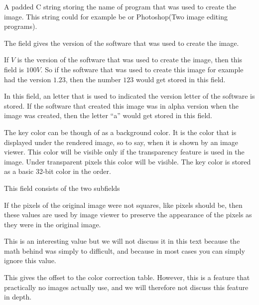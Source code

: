 A \nullm padded C string storing the name of program that was used to
create the image. This string could for example be \gimp or
Photoshop(Two image editing programs).


The field gives the version of the software that was used to create
the image.


If $V$ is the version of the software that was used to create the
image, then this field is $100V$. So if the software that was
used to create this image for example had the version $1.23$, then the
number $123$ would get stored in this field.


In this field, an \ascii letter that is used to indicated the version
letter of the software is stored. If the software that created this
image was in alpha version when the image was created, then the letter
``a'' would get stored in this field.


The key color can be though of as a background color. It is the color
that is displayed under the rendered image, so to say, when it is
shown by an image viewer. This color will be visible only if the
transparency feature is used in the image. Under transparent pixels
this color will be visible. The key color is stored as a basic 32-bit
color in the \argb order.


This field consists of the two subfields


If the pixels of the original image were not squares, like pixels
should be, then these values are used by image viewer to preserve the
appearance of the pixels as they were in the original image.


This is an interesting value but we will not discuss it in this text
because the math behind was simply to difficult, and because in most
cases you can simply ignore this value.


This gives the offset to the color correction table. However, this is
a feature that practically no \tga images actually use, and we will
therefore not discuss this feature in depth.

